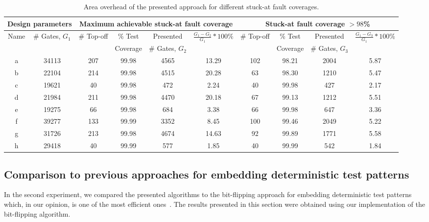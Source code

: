 \documentclass[10pt,conference]{IEEEtran}
\begin{document}
\begin{table*}[th]\centering\footnotesize
\begin{tabular}{|c|c||c|c|c|c||c|c|c|c|} \hline 
\multicolumn{2}{|c|}{Design parameters}  & \multicolumn{4}{|c|}{Maximum achievable stuck-at fault coverage} & \multicolumn{4}{|c|}{Stuck-at fault coverage $> 98$\%} \\ \hline
\multirow{2}{*}{Name}	& \multirow{2}{*}{\# Gates, $G_1$} &  \multirow{2}{*}{\# Top-off} & \% Test &  Presented &   \multirow{2}{*}{$\frac{G_1-G_2}{G_1}*100\%$} &  \multirow{2}{*}{\# Top-off} & \% Test &  Presented &   \multirow{2}{*}{$\frac{G_1-G_3}{G_1}*100\%$} \\
	&               &       &  Coverage  & \# Gates, $G_2$ & &  & Coverage  & \# Gates, $G_3$ &   \\ \hline
a	& 34113 & 207 & 99.98 & 4565 & 13.29 & 102	& 98.21 & 2004 & 5.87 \\
b	& 22104	& 214	& 99.98	& 4515	& 20.28	& 63 & 98.30	& 1210	& 5.47	\\
c	& 19621 & 40 & 99.98	& 472 & 2.24	& 40 & 99.98 &	427	& 2.17	\\
d	& 21984	& 211	& 99.98	& 4470 & 20.18 & 67	& 99.13 & 1212 & 5.51 \\
e	& 19275 & 66	& 99.98	& 684 & 3.38	& 66	& 99.98 & 647 & 3.36		\\
f	& 39277 & 133 & 99.99 & 3352 & 8.45 & 100	& 99.46 & 2049 & 5.22 \\
g	& 31726 & 213 & 99.98 & 4674 & 14.63 & 92	& 99.89 & 1771 & 5.58 \\
h	& 29418	& 40 &	99.99	& 577 & 1.85	& 40	& 99.99 & 542 & 1.84	\\ \hline
\end{tabular}
\caption{Area overhead of the presented approach for different stuck-at fault coverages.}
\label{ta3}
\end{table*}





\subsection{Comparison to previous approaches for embedding deterministic test patterns}

In the second experiment, we compared the presented algorithms to the bit-flipping
approach for embedding deterministic test patterns which, in our 
opinion, is one of the most efficient ones~\cite{WuK96}. 
The results presented in this section were obtained using our implementation of 
the bit-flipping algorithm. 
 
\end{document}
